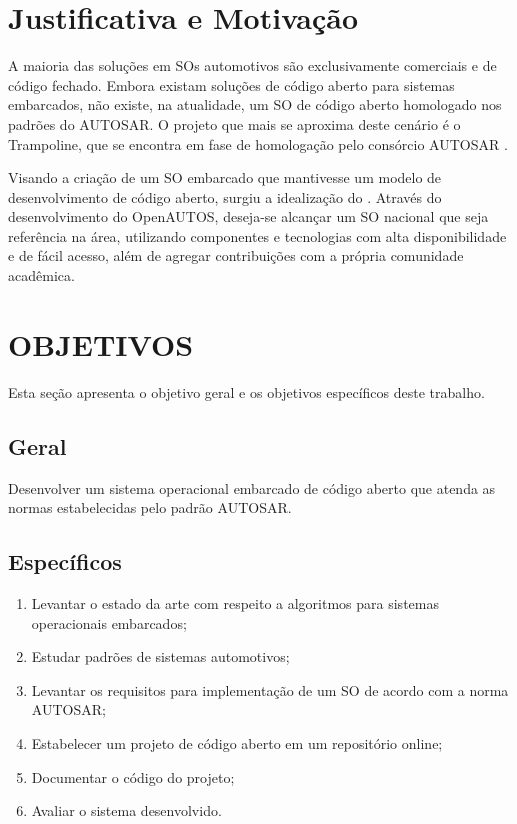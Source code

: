 \section{Justificativa e Motivação}

A maioria das soluções em SOs automotivos são exclusivamente comerciais e de código fechado. Embora existam soluções de código aberto para sistemas embarcados, não existe, na atualidade, um SO de código aberto homologado nos padrões do AUTOSAR. O projeto que mais se aproxima deste cenário é o Trampoline, que se encontra em fase de homologação pelo consórcio AUTOSAR \cite{Trampoline:HOME}.

Visando a criação de um SO embarcado que mantivesse um modelo de desenvolvimento de código aberto, surgiu a idealização do . Através do desenvolvimento do OpenAUTOS, deseja-se alcançar um SO nacional que seja referência na área, utilizando componentes e tecnologias com alta disponibilidade e de fácil acesso, além de agregar contribuições com a própria comunidade acadêmica.

\section{OBJETIVOS}

Esta seção apresenta o objetivo geral e os objetivos específicos deste trabalho.

\subsection{Geral}

Desenvolver um sistema operacional embarcado de código aberto que atenda as normas estabelecidas pelo padrão AUTOSAR.

\subsection{Específicos}
\begin{enumerate}
	\item Levantar o estado da arte com respeito a algoritmos para sistemas operacionais embarcados;
	\item Estudar padrões de sistemas automotivos;
	\item Levantar os requisitos para implementação de um SO de acordo com a norma AUTOSAR;
	\item Estabelecer um projeto de código aberto em um repositório online;
	\item Documentar o código do projeto;
	\item Avaliar o sistema desenvolvido.
\end{enumerate}

